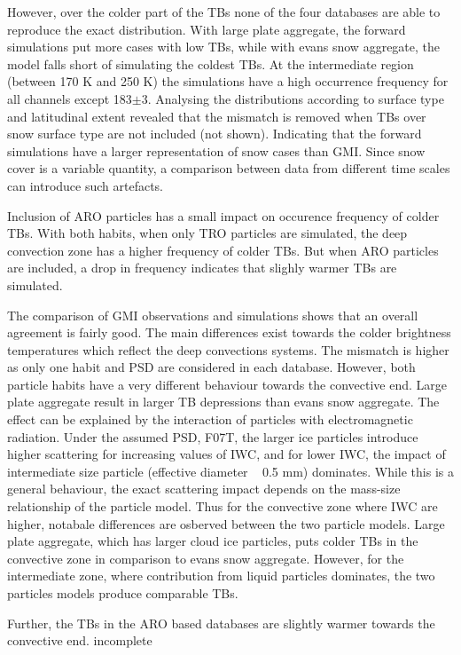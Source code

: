 \documentclass[amt, manuscript]{copernicus}
\newcommand{\todo}[1]{{\color{red} #1}}
\begin{document}
However, over the colder part of the TBs none of the four databases are able to reproduce the exact distribution. With large plate aggregate, the forward simulations put more cases with low TBs, while with evans snow aggregate, the model falls short of simulating the coldest TBs. At the intermediate region (between 170\,\,K and 250\,\,K) the simulations have a high occurrence frequency for all channels except 183$\pm$3. Analysing the distributions according to surface type and latitudinal extent revealed that the mismatch is removed when TBs over snow surface type are not included (not shown). Indicating that the forward simulations have a larger representation of snow cases than GMI. Since snow cover is a variable quantity, a comparison between data from different time scales can introduce such artefacts. 

Inclusion of ARO particles has a small impact on occurence frequency of colder TBs. With both habits, when only TRO particles are simulated, the deep convection zone has a higher frequency of colder TBs. But when ARO particles are included, a drop in frequency indicates that slighly warmer TBs are simulated. 

The comparison of GMI observations and simulations shows that an overall agreement is fairly good. The main differences exist towards the colder brightness temperatures which reflect the deep convections systems. The mismatch is higher as only one habit and PSD are considered in each database. However, both particle habits have a very different behaviour towards the convective end. Large plate aggregate result in larger TB depressions than evans snow aggregate. The effect can be explained by the interaction of particles with electromagnetic radiation. Under the assumed PSD, F07T, the larger ice particles introduce higher scattering for increasing values of IWC, and for lower IWC, the impact of intermediate size particle (effective diameter ~ 0.5\,\,mm) dominates. While this is a general behaviour, the exact scattering impact depends on the mass-size relationship of the particle model. Thus for the convective zone where IWC are higher, notabale differences are osberved between the two particle models. Large plate aggregate, which has larger cloud ice particles, puts colder TBs in the convective zone in comparison to evans snow aggregate. However, for the intermediate zone, where contribution from liquid particles dominates, the two particles models produce comparable TBs.

Further, the TBs in the ARO based databases are slightly warmer towards the convective end. \todo{incomplete}
\end{document}
